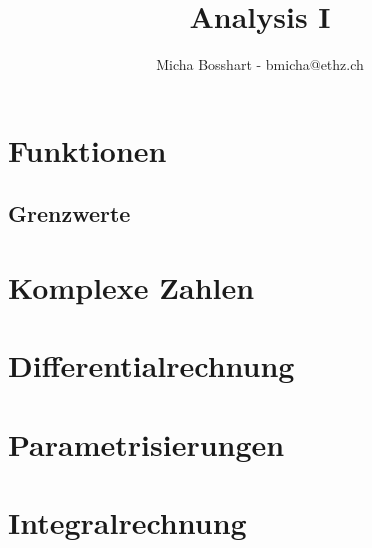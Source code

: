 \documentclass[8pt]{mpscheatsheet}
\author{Micha Bosshart - bmicha@ethz.ch}
\title{Analysis I}
\begin{document}
    \section{Funktionen}
        
        \subsection{Grenzwerte}
        
        
        
        
        
    \section{Komplexe Zahlen}
        
        
    \section{Differentialrechnung}
        
        
        
        
        
        \vfill \null \columnbreak
        \section{Parametrisierungen}
        
    \section{Integralrechnung}
        
        
        
        \vfill \null \columnbreak
        
        
        
        \vfill \null \columnbreak
        
        
        
\end{document}
